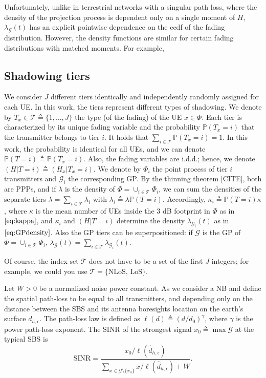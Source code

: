 \documentclass[conference]{IEEEtran}
\theoremstyle{definition}
\theoremstyle{plain}
\begin{document}
          Unfortunately, unlike in terrestrial networks with a singular path loss, where the density of the projection process is dependent only on a single moment of $H$, $\lambda_{\mathcal{G}}(t)$ has an explicit pointwise dependence on the ccdf of the fading distribution. However, the density functions are similar for certain fading distributions with matched moments. For example,

          \subsection{Shadowing tiers}

          
          We consider $J$ different tiers identically and independently randomly assigned for each UE. In this work, the tiers represent different types of shadowing. We denote by $T_x \in \mathcal{T} \triangleq \{1,\dots, J\}$ the type (of the fading) of the UE $x \in \Phi $. Each tier is characterized by its unique fading variable and the probability $\mathbb{P}(T_x = i)$ that the transmitter belongs to tier $i$. It holds that $\sum_{i \in \mathcal{T}} \mathbb{P}(T_x = i) =1$. In this work, the probability is identical for all UEs, and we can denote $\mathbb{P}(T = i) \triangleq \mathbb{P}(T_x = i)$. Also, the fading variables are i.d.d.; hence, we denote $(H | T=i) \triangleq (H_x | T_x=i)$. We denote by $\Phi_i$ the point process of tier $i$ transmitters and $\mathcal{G}_i$ the corresponding GP. By the thinning theorem [CITE], both are PPPs, and if $\lambda$ is the density of $\Phi=\cup_{i \in \mathcal{T}} \Phi_i$, we can sum the densities of the separate tiers $\lambda = \sum_{i \in \mathcal{T}} \lambda_i$ with $\lambda_i \triangleq \lambda \mathbb{P}(T = i)$. Accordingly,  ${\kappa}_i \triangleq \mathbb{P}(T = i){\kappa}$, where $\kappa$ is the mean number of UEs inside the $3$ dB footprint in $\Phi$ as in $\eqref{eq:kappa}$, and $\kappa_i$ and $(H|T=i)$ determine the density $\lambda_{\mathcal{G}_i}(t)$ as in $\eqref{eq:GPdensity}$. Also the GP tiers can be superpositioned: if $\mathcal{G}$ is the GP of $\Phi=\cup_{i \in \mathcal{T}} \Phi_i$, $\lambda_{\mathcal{G}}(t)= \sum_{i \in \mathcal{T}}\lambda_{\mathcal{G}_i}(t)$. 

          Of course, the index set $\mathcal{T}$ does not have to be a set of the first $J$ integers; for example, we could you use $\mathcal{T}=\{\text{NLoS, LoS} \}$.

          Let $W>0$ be a normalized noise power constant. As we consider a NB and define the spatial path-loss to be equal to all transmitters, and depending only on the distance between the SBS and its antenna boresights location on the earth's surface $d_{h,\epsilon}$. The path-loss law is defined as $\ell({d}) \triangleq ({d}/d_0)^{\gamma}$, where $\gamma$ is the power path-loss exponent. The SINR of the strongest signal $x_0 \triangleq \max  \mathcal{G}$ at the typical SBS is 
          \begin{equation}
            \text{SINR} = \frac{x_0/\ell(\hat{d}_{h,\epsilon})}{\sum\limits_{x \in \mathcal{G} \setminus \{x_0\}}x/\ell(\hat{d}_{h,\epsilon})+ W}.
          \end{equation}
\end{document}
